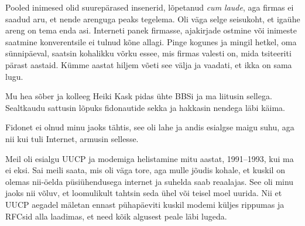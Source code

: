 Pooled inimesed olid suurepärased insenerid, lõpetanud \emph{cum laude}, aga firmas ei saadud aru, et nende arenguga peaks tegelema. 
Oli väga selge seisukoht, et igaühe areng on tema enda asi. 
Interneti panek firmasse, ajakirjade ostmine või 
inimeste saatmine konverentsile ei tulnud kõne allagi. Pinge 
kogunes ja mingil hetkel, oma sünnipäeval, saatsin kohalikku võrku essee, mis firmas valesti on, mida tsiteeriti
pärast aastaid. Kümme aastat hiljem võeti see välja ja vaadati, et ikka on sama lugu. 


Mu hea sõber ja kolleeg Heiki Kask pidas ühte 
BBSi ja ma liitusin sellega. Sealtkaudu sattusin lõpuks fidonautide 
sekka ja hakkasin nendega läbi käima. 


Fidonet ei olnud minu jaoks tähtis, see oli lahe ja andis 
esialgse maigu suhu, aga nii kui tuli Internet, armusin sellesse.


Meil oli esialgu UUCP ja modemiga helistamine mitu aastat, 1991--1993, kui ma 
ei eksi. Sai meili saata, mis oli väga tore, aga mulle jõudis kohale, et kuskil on 
olemas nii-öelda püsiühendusega internet ja suhelda saab reaalajas. 
See oli minu jaoks nii võluv, et 
loomulikult tahtsin seda ühel või teisel moel uurida. Nii et UUCP 
aegadel mäletan ennast pühapäeviti kuskil modemi küljes rippumas ja RFCsid 
alla laadimas, et need kõik algusest peale läbi lugeda.

